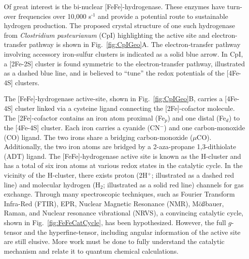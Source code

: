 Of great interest is the bi-nuclear [FeFe]-hydrogenase. \cite{PETERS20151350} These enzymes have turn-over frequencies over 10,000 s$^{\text{-1}}$\cite{CatalyticTOF} and provide a potential route to sustainable hydrogen production. The proposed crystal structure of one such hydrogenase from \textit{Clostridium pasteurianum} (CpI) highlighting the active site and electron-transfer pathway is shown in Fig.~\ref{fig:CpIGeo}A. \cite{FeFeCry} The electron-transfer pathway involving accessory iron-sulfur clusters is indicated as a solid blue arrow. In CpI, a [2Fe-2S] cluster is found symmetric to the electron-transfer pathway, illustrated as a dashed blue line, and is believed to ``tune'' the redox potentials of the [4Fe-4S] clusters. \cite{PetersPotentials} 

The [FeFe]-hydrogenase active-site, shown in Fig.~\ref{fig:CpIGeo}B, carries a [4Fe-4S] cluster linked via a cysteine ligand connecting the [2Fe]-cofactor molecule. The [2Fe]-cofactor contains an iron atom proximal (Fe$_p$) and one distal (Fe$_d$) to the [4Fe-4S] cluster. Each iron carries a cyanide (CN$^-$) and one carbon-monoxide (CO) ligand. The two irons share a bridging carbon-monoxide ($\mu$CO). Additionally, the two iron atoms are bridged by a 2-aza-propane 1,3-dithiolate (ADT) ligand. The [FeFe]-hydrogenase active site is known as the H-cluster and has a total of six iron atoms at various redox states in the catalytic cycle. In the vicinity of the H-cluster, there exists proton (2H$^+$; illustrated as a dashed red line) and molecular hydrogen (H$_2$; illustrated as a solid red line) channels for gas exchange. Through many spectroscopic techniques, such as Fourier Transform Infra-Red (FTIR), EPR, Nuclear Magnetic Resonance (NMR), M\"o\ss{}bauer, Raman, and Nuclear resonance vibrational (NRVS), a convincing catalytic cycle, shown in Fig.~\ref{fig:FeFeCatCycle}, has been hypothesized. \cite{lubitzhyd, NRVS2017, sommer2017} However, the full $g$-tensor and the hyperfine-tensor, including angular information of the active site are still elusive. More work must be done to fully understand the catalytic mechanism and relate it to quantum chemical calculations. 


